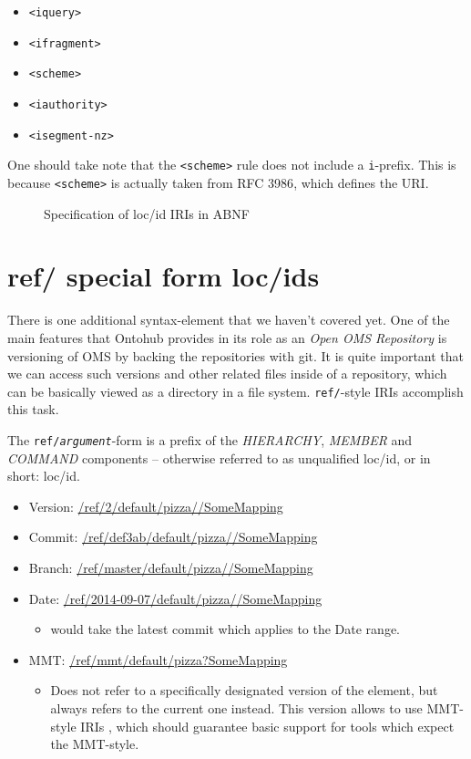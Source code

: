 \documentclass[10pt,fleqn,%
\ifpretendfinal
final%
\else
draft%
\fi,
]{scrreprt}
\begin{document}
\begin{itemize}
  \item \texttt{<iquery>}
  \item \texttt{<ifragment>}
  \item \texttt{<scheme>}
  \item \texttt{<iauthority>}
  \item \texttt{<isegment-nz>}
\end{itemize}

One should take note that the \texttt{<scheme>} rule does not include a
\texttt{i}-prefix.  This is because \texttt{<scheme>} is actually taken from
RFC 3986\cite{rfc3986}, which defines the URI.

\begin{figure}[b]
  \centering
  
  \caption[loc/id specification in ABNF]
   {Specification of loc/id IRIs in ABNF}
  \label{lst:loc-id-spec}
\end{figure}

\clearpage
\section{ref/ special form loc/ids}

There is one additional syntax-element that we haven't covered yet. One of the
main features that Ontohub provides in its role as an \emph{Open OMS Repository}
is versioning of OMS by backing the repositories with git. It is quite
important that we can access such versions and other related files inside of a
repository, which can be basically viewed as a directory in a file system.
\texttt{ref/}-style IRIs accomplish this task.

The \texttt{ref/\emph{argument}}-form is a prefix of the \emph{HIERARCHY},
\emph{MEMBER} and \emph{COMMAND} components -- otherwise referred to as
unqualified loc/id, or in short: loc/id.

\begin{itemize}
  \item Version: \url{/ref/2/default/pizza//SomeMapping}
  \item Commit: \url{/ref/def3ab/default/pizza//SomeMapping}
  \item Branch: \url{/ref/master/default/pizza//SomeMapping}
  \item Date: \url{/ref/2014-09-07/default/pizza//SomeMapping}
    \begin{itemize}
      \item would take the latest commit which applies to the Date range.
    \end{itemize}
  \item MMT: \url{/ref/mmt/default/pizza?SomeMapping}
    \begin{itemize}
      \item Does not refer to a specifically designated version of the element,
        but always refers to the current one instead. This version allows to
        use MMT-style IRIs \cite{RabKoh:WSMSML13}, 
        which should guarantee basic support for tools
        which expect the MMT-style.
    \end{itemize}
\end{itemize}
\end{document}
